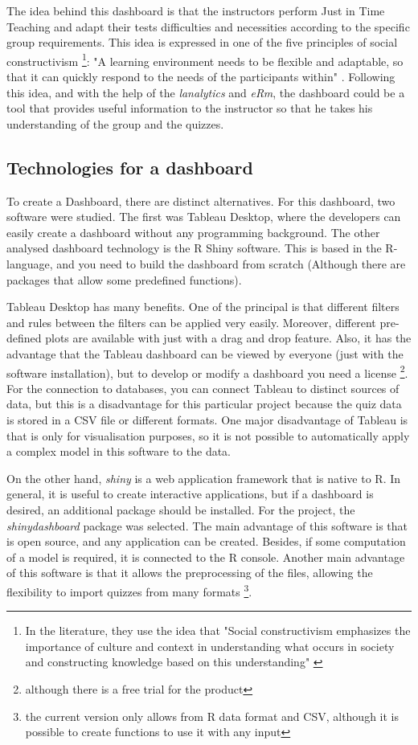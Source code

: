 The idea behind this dashboard is that the instructors perform Just in Time Teaching and adapt their tests difficulties and necessities according to the specific group requirements. This idea is expressed in one of the five principles of social constructivism \footnote{In the literature, they use the idea that "Social constructivism emphasizes the importance of culture and context in understanding what occurs in society and constructing knowledge based on this understanding" \cite{kim2001social} \cite{mcmahon1997social}}: "A learning environment needs to be flexible and adaptable, so that it can quickly respond to the needs of the participants within" \cite{payne2009information} \cite{moodle}. Following this idea, and with the help of the \textit{lanalytics} and \textit{eRm}, the dashboard could be a tool that provides useful information to the instructor so that he takes his understanding of the group and the quizzes. 

\subsection{Technologies for a dashboard}

To create a Dashboard, there are distinct alternatives. For this dashboard, two software were studied. The first was Tableau Desktop, where the developers can easily create a dashboard without any programming background. The other analysed dashboard technology is the R Shiny software. This is based in the R-language, and you need to build the dashboard from scratch (Although there are packages that allow some predefined functions).

Tableau Desktop has many benefits. One of the principal is that different filters and rules between the filters can be applied very easily. Moreover, different pre-defined plots are available with just with a drag and drop feature. Also, it has the advantage that the Tableau dashboard can be viewed by everyone (just with the software installation), but to develop or modify a dashboard you need a license \footnote{although there is a free trial for the product}. For the connection to databases, you can connect Tableau to distinct sources of data, but this is a disadvantage for this particular project because the quiz data is stored in a CSV file or different formats. One major disadvantage of Tableau is that is only for visualisation purposes, so it is not possible to automatically apply a complex model in this software to the data.

On the other hand, \textit{shiny} is a web application framework that is native to R. In general, it is useful to create interactive applications, but if a dashboard is desired, an additional package should be installed. For the project, the \textit{shinydashboard} package was selected. The main advantage of this software is that is open source, and any application can be created. Besides, if some computation of a model is required, it is connected to the R console. Another main advantage of this software is that it allows the preprocessing of the files, allowing the flexibility to import quizzes from many formats \footnote{the current version only allows from R data format and CSV, although it is possible to create functions to use it with any input}.

